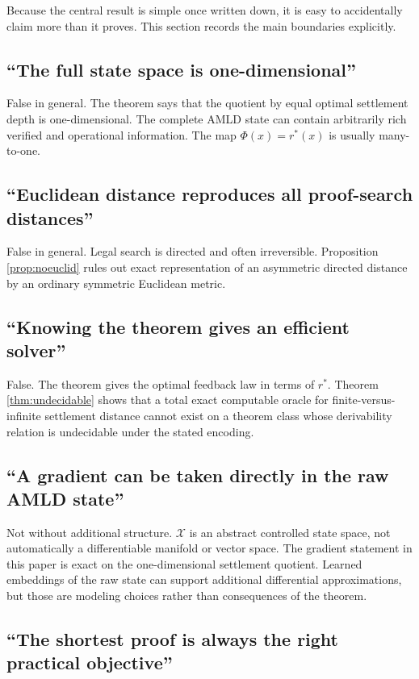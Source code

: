 \documentclass[11pt,letterpaper]{article}
\theoremstyle{remark}
\newcommand{\X}{\mathcal X}
\newcommand{\rstar}{r^{\!*}}
\begin{document}
Because the central result is simple once written down, it is easy to accidentally claim more than it proves. This section records the main boundaries explicitly.

\subsection{``The full state space is one-dimensional''}

False in general. The theorem says that the quotient by equal optimal settlement depth is one-dimensional. The complete AMLD state can contain arbitrarily rich verified and operational information. The map $\Phi(x)=\rstar(x)$ is usually many-to-one.

\subsection{``Euclidean distance reproduces all proof-search distances''}

False in general. Legal search is directed and often irreversible. Proposition \ref{prop:noeuclid} rules out exact representation of an asymmetric directed distance by an ordinary symmetric Euclidean metric.

\subsection{``Knowing the theorem gives an efficient solver''}

False. The theorem gives the optimal feedback law in terms of $\rstar$. Theorem \ref{thm:undecidable} shows that a total exact computable oracle for finite-versus-infinite settlement distance cannot exist on a theorem class whose derivability relation is undecidable under the stated encoding.

\subsection{``A gradient can be taken directly in the raw AMLD state''}

Not without additional structure. $\X$ is an abstract controlled state space, not automatically a differentiable manifold or vector space. The gradient statement in this paper is exact on the one-dimensional settlement quotient. Learned embeddings of the raw state can support additional differential approximations, but those are modeling choices rather than consequences of the theorem.

\subsection{``The shortest proof is always the right practical objective''}
\end{document}
